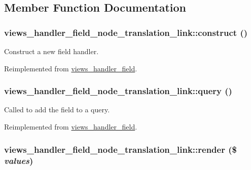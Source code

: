 \subsection{Member Function Documentation}
\hypertarget{classviews__handler__field__node__translation__link_834c20607c0a929900b7ace53425847a}{
\subsubsection[{construct}]{\setlength{\rightskip}{0pt plus 5cm}views\_\-handler\_\-field\_\-node\_\-translation\_\-link::construct ()}}
\label{classviews__handler__field__node__translation__link_834c20607c0a929900b7ace53425847a}


Construct a new field handler. 

Reimplemented from \hyperlink{classviews__handler__field_3d50050864c255b71c842972a45d39f6}{views\_\-handler\_\-field}.\hypertarget{classviews__handler__field__node__translation__link_ccd7784b851085dadf55b773f1845097}{
\subsubsection[{query}]{\setlength{\rightskip}{0pt plus 5cm}views\_\-handler\_\-field\_\-node\_\-translation\_\-link::query ()}}
\label{classviews__handler__field__node__translation__link_ccd7784b851085dadf55b773f1845097}


Called to add the field to a query. 

Reimplemented from \hyperlink{classviews__handler__field_4f661f91bcbe80d4a00c30a31456c502}{views\_\-handler\_\-field}.\hypertarget{classviews__handler__field__node__translation__link_24fd39ca3d02b69858986ee7ba580d41}{
\subsubsection[{render}]{\setlength{\rightskip}{0pt plus 5cm}views\_\-handler\_\-field\_\-node\_\-translation\_\-link::render (\$ {\em values})}}
\label{classviews__handler__field__node__translation__link_24fd39ca3d02b69858986ee7ba580d41}


